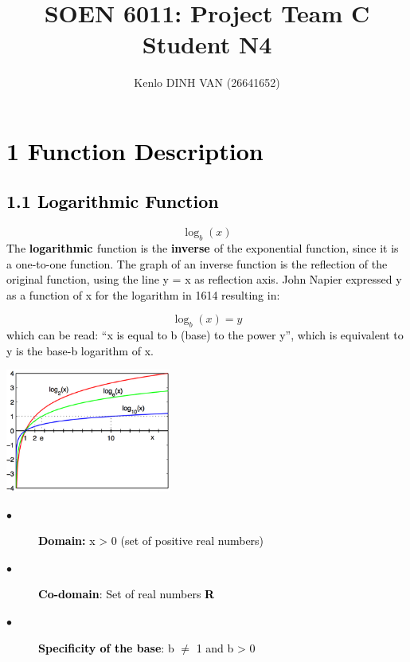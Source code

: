 \documentclass[letterpaper]{article}
\title{SOEN 6011: Project Team C Student N4}
\author{Kenlo DINH VAN (26641652)}
\date{}
\begin{document}
\maketitle

\bigskip

\section[1 Function Description]{\textbf{\textcolor{black}{1 Function Description}}}
\subsection[1.1 Logarithmic Function]{\textbf{\textcolor{black}{1.1 Logarithmic Function}}}
\begin{equation*}
\log _b(x)
\end{equation*}
\textcolor{black}{The }\textbf{\textcolor{black}{logarithmic }}\textcolor{black}{  function is the
}\textbf{\textcolor{black}{inverse }}\textcolor{black}{ of the exponential function, since it is a one-to-one function.
The graph of an inverse function is the reflection of the original function, using the line y = x as reflection axis.
John Napier expressed y as a function of x for the logarithm in 1614 resulting in:}

\begin{equation*}
\log _b(x)=y
\end{equation*}
\textcolor{black}{which can be read: ``x is equal to b (base) to the power y'', which is equivalent to {\textquotedbl}y
is the base-b logarithm of x.{\textquotedbl}}

{\centering  \includegraphics[width=5.44cm,height=4.038cm]{N4PB12-img001.png} \par}


 \begin{description}
  \item[$\bullet$] \textbf{\textcolor{black}{Domain}\textcolor{black}{:}}\textcolor{black}{ x {\textgreater} 0
(set of positive real numbers) }
  \item[$\bullet$] \textbf{\textcolor{black}{Co-domain}}\textcolor{black}{: Set of real numbers
}\textbf{\textcolor{black}{R}}
\item[$\bullet$]{\textbf{\textcolor{black}{Specificity of the base}}}\textcolor{black}{: b ${\neq}$ 1 and b
{\textgreater} 0}
\end{description}
\end{document}

